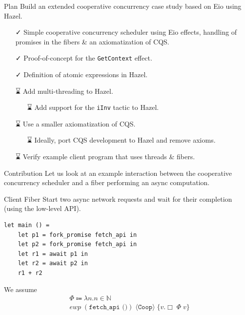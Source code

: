 \documentclass[aspectratio=43]{beamer}
\newcommand{\done}{{\symfontextra ✓}}
\newcommand{\tbd}{{\symfontextra ⌛}}
\newcommand{\proto}{\mathtt{Coop}}
\newcommand{\ewp}[3]{\textit{ewp}\; (#1)\; \langle #2 \rangle\; \{#3\}}
\newcommand{\pers}[1]{\Box\; #1}
\begin{document}
\begin{frame}{Plan}
    Build an extended cooperative concurrency case study based on Eio using Hazel.
    \begin{itemize}
        \item[\done{}] Simple cooperative concurrency scheduler using Eio effects, handling of promises in the fibers \& an axiomatization of CQS.
        \item[\done{}] Proof-of-concept for the \texttt{GetContext} effect.
        \item[\done{}] Definition of atomic expressions in Hazel.
        \item[\tbd{}] Add multi-threading to Hazel.
            \begin{itemize}
                \item[\tbd{}] Add support for the \texttt{iInv} tactic to Hazel.
            \end{itemize}
        \item[\tbd{}] Use a smaller axiomatization of CQS.
            \begin{itemize}
                \item[\tbd{}] Ideally, port CQS development to Hazel and remove axioms.
            \end{itemize}
        \item[\tbd{}] Verify example client program that uses threads \& fibers.
    \end{itemize}
\end{frame}

\begin{frame}{Contribution}
    Let us look at an example interaction between the cooperative concurrency scheduler and a fiber performing an async computation.
\end{frame}

\begin{frame}[fragile]{Client Fiber}
    Start two async network requests and wait for their completion (using the low-level API).
    \begin{verbatim}
let main () = 
    let p1 = fork_promise fetch_api in
    let p2 = fork_promise fetch_api in
    let r1 = await p1 in 
    let r2 = await p2 in 
    r1 + r2
    \end{verbatim}
    We assume
    \begin{align*}
         & \Phi \Coloneqq \lambda n. n \in \mathbb{N}                 \\
         & \ewp{\texttt{fetch\_api ()}}{\proto{}}{v. \pers{\Phi\; v}}
    \end{align*}
\end{frame}
\end{document}
